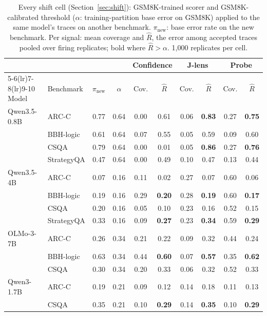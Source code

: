 \begin{table}[H]
\centering\scriptsize
\caption{Every shift cell (Section~\ref{sec:shift}): GSM8K-trained scorer and GSM8K-calibrated threshold ($\alpha$: training-partition base error on GSM8K) applied to the same model's traces on another benchmark. $\pi_{\mathrm{new}}$: base error rate on the new benchmark. Per signal: mean coverage and $\hat R$, the error among accepted traces pooled over firing replicates; bold where $\hat R>\alpha$. 1{,}000 replicates per cell.}
\label{tab:shift}
\setlength{\tabcolsep}{4pt}
\begin{tabular}{ll cc cc cc cc}
\toprule
 & & & & \multicolumn{2}{c}{Confidence} & \multicolumn{2}{c}{J-lens} & \multicolumn{2}{c}{Probe} \\
\cmidrule(lr){5-6}\cmidrule(lr){7-8}\cmidrule(lr){9-10}
Model & Benchmark & $\pi_{\mathrm{new}}$ & $\alpha$ & Cov. & $\hat R$ & Cov. & $\hat R$ & Cov. & $\hat R$ \\
\midrule
Qwen3.5-0.8B & ARC-C & 0.77 & 0.64 & 0.00 & 0.61 & 0.06 & \textbf{0.83} & 0.27 & \textbf{0.75} \\
 & BBH-logic & 0.61 & 0.64 & 0.07 & 0.55 & 0.05 & 0.59 & 0.09 & 0.60 \\
 & CSQA & 0.79 & 0.64 & 0.00 & 0.01 & 0.05 & \textbf{0.86} & 0.27 & \textbf{0.76} \\
 & StrategyQA & 0.47 & 0.64 & 0.00 & 0.49 & 0.10 & 0.47 & 0.13 & 0.44 \\
\addlinespace
Qwen3.5-4B & ARC-C & 0.07 & 0.16 & 0.11 & 0.02 & 0.27 & 0.07 & 0.60 & 0.06 \\
 & BBH-logic & 0.19 & 0.16 & 0.29 & \textbf{0.20} & 0.28 & \textbf{0.19} & 0.60 & \textbf{0.17} \\
 & CSQA & 0.20 & 0.16 & 0.05 & 0.10 & 0.23 & 0.16 & 0.52 & 0.15 \\
 & StrategyQA & 0.33 & 0.16 & 0.09 & \textbf{0.27} & 0.23 & \textbf{0.34} & 0.59 & \textbf{0.29} \\
\addlinespace
OLMo-3-7B & ARC-C & 0.26 & 0.34 & 0.21 & 0.22 & 0.09 & 0.32 & 0.44 & 0.24 \\
 & BBH-logic & 0.63 & 0.34 & 0.44 & \textbf{0.60} & 0.07 & \textbf{0.57} & 0.35 & \textbf{0.62} \\
 & CSQA & 0.30 & 0.34 & 0.20 & 0.33 & 0.06 & 0.32 & 0.52 & 0.33 \\
\addlinespace
Qwen3-1.7B & ARC-C & 0.19 & 0.21 & 0.09 & 0.12 & 0.14 & 0.18 & 0.11 & 0.13 \\
 & CSQA & 0.35 & 0.21 & 0.10 & \textbf{0.29} & 0.14 & \textbf{0.35} & 0.10 & \textbf{0.29} \\

\end{tabular}
\end{table}

